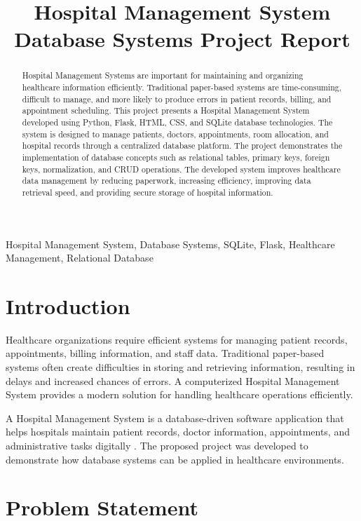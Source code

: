 \documentclass[conference]{IEEEtran}
\title{Hospital Management System\\
Database Systems Project Report}
\author{
\IEEEauthorblockN{Shaista Naseem, Aiman Zubair, Waleed Ahmed}
\IEEEauthorblockA{
School of Computing Sciences \\
Pak-Austria Fachhochschule: Institute of Applied Sciences and Technology \\
Haripur, Pakistan \\
Course: Database Systems
}
}
\begin{document}
\maketitle

\begin{abstract}
Hospital Management Systems are important for maintaining and organizing healthcare information efficiently. Traditional paper-based systems are time-consuming, difficult to manage, and more likely to produce errors in patient records, billing, and appointment scheduling. This project presents a Hospital Management System developed using Python, Flask, HTML, CSS, and SQLite database technologies. The system is designed to manage patients, doctors, appointments, room allocation, and hospital records through a centralized database platform. The project demonstrates the implementation of database concepts such as relational tables, primary keys, foreign keys, normalization, and CRUD operations. The developed system improves healthcare data management by reducing paperwork, increasing efficiency, improving data retrieval speed, and providing secure storage of hospital information.
\end{abstract}

\begin{IEEEkeywords}
Hospital Management System, Database Systems, SQLite, Flask, Healthcare Management, Relational Database
\end{IEEEkeywords}

\section{Introduction}

Healthcare organizations require efficient systems for managing patient records, appointments, billing information, and staff data. Traditional paper-based systems often create difficulties in storing and retrieving information, resulting in delays and increased chances of errors. A computerized Hospital Management System provides a modern solution for handling healthcare operations efficiently.

A Hospital Management System is a database-driven software application that helps hospitals maintain patient records, doctor information, appointments, and administrative tasks digitally \cite{ref1}. The proposed project was developed to demonstrate how database systems can be applied in healthcare environments.

\section{Problem Statement}
\end{document}
